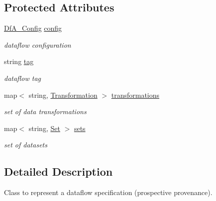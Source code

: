 \subsection*{Protected Attributes}
\begin{DoxyCompactItemize}
\item 
\mbox{\label{classDataflow_a9194612ab9663190100ac63ef4a570ca}} 
\hyperlink{structDfA__Config}{Df\+A\+\_\+\+Config} \hyperlink{classDataflow_a9194612ab9663190100ac63ef4a570ca}{config}
\begin{DoxyCompactList}\small\item\em dataflow configuration \end{DoxyCompactList}\item 
\mbox{\label{classDataflow_a45d9ba19359e42a9a8d1fa089c994b17}} 
string \hyperlink{classDataflow_a45d9ba19359e42a9a8d1fa089c994b17}{tag}
\begin{DoxyCompactList}\small\item\em dataflow tag \end{DoxyCompactList}\item 
\mbox{\label{classDataflow_a8b7aa91c6867e58d0829f2fdf0f74012}} 
map$<$ string, \hyperlink{classTransformation}{Transformation} $>$ \hyperlink{classDataflow_a8b7aa91c6867e58d0829f2fdf0f74012}{transformations}
\begin{DoxyCompactList}\small\item\em set of data transformations \end{DoxyCompactList}\item 
\mbox{\label{classDataflow_a9adaff2ceea3186eb28aebf42b5c6911}} 
map$<$ string, \hyperlink{classSet}{Set} $>$ \hyperlink{classDataflow_a9adaff2ceea3186eb28aebf42b5c6911}{sets}
\begin{DoxyCompactList}\small\item\em set of datasets \end{DoxyCompactList}\end{DoxyCompactItemize}


\subsection{Detailed Description}
Class to represent a dataflow specification (prospective provenance). 

